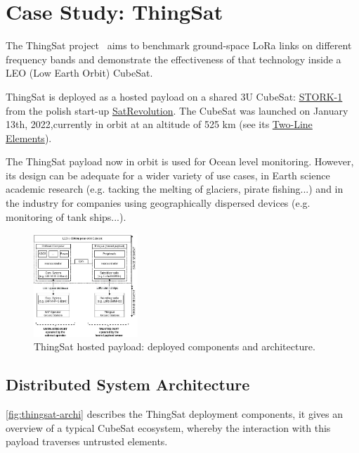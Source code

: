 \section{Case Study: ThingSat}
\label{sec:case-study}

The ThingSat project~\cite{git:thingsat-repo} aims to benchmark ground-space
LoRa links on different frequency bands and demonstrate the
effectiveness of that technology inside a LEO (Low Earth Orbit) CubeSat.

ThingSat is deployed as a hosted payload on a shared 3U CubeSat:
\href{https://space.skyrocket.de/doc_sdat/stork-1.htm}{STORK-1} from the polish
start-up \href{https://www.satrevolution.com/}{SatRevolution}. The CubeSat was
launched on January 13th, 2022,currently in orbit at an altitude of 525 km (see its
\href{https://www.n2yo.com/database/?q=STORK-1\#results}{Two-Line Elements}).

The ThingSat payload now in orbit is used for Ocean level monitoring. However,
its design can be adequate for a wider variety of use cases, in Earth science
academic research (e.g. tacking the  melting of glaciers, pirate fishing...)
and in the industry for companies using geographically dispersed devices (e.g.
monitoring of tank ships...).

\begin{figure}[t]
\centering
    \includegraphics[width=0.35\textwidth]{Figures/globecom-thingsat-mods.jpg}
    \caption{ThingSat hosted payload: deployed components and architecture.}
    \label{fig:thingsat-archi}
\end{figure}

\subsection{Distributed System Architecture}
\label{sec:thingsat-hw}
\autoref{fig:thingsat-archi} describes the ThingSat deployment components, it gives an
overview of a typical CubeSat ecosystem, whereby the interaction with this payload
traverses untrusted elements.

